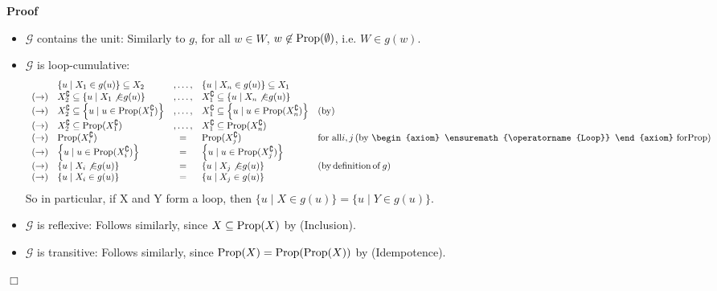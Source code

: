 \documentclass{article}
\newcommand{\nin}{\not\in}
\newcommand{\tmop}[1]{\ensuremath{\operatorname{#1}}}
\newenvironment{proof}{\noindent\textbf{Proof\ }}{\hspace*{\fill}$\Box$\medskip}
\newtheorem{axiom}{Axiom}
\newcommand{\Prop}{\textsf{\tmop{Prop}}}
\begin{document}
\begin{proof}
\begin{itemize}
    \item $\mathcal{G}$ contains the unit: Similarly to $g$, for all $w \in
    W$, $w \nin \Prop (\emptyset)$, i.e. $W \in g (w)$.
    
    \item $\mathcal{G}$ is loop-cumulative:
    \[ \begin{array}{rlcll}
         & \{ u \mid X_1 \in g (u) \} \subseteq X_2 & , \ldots, & \{ u \mid
         X_n \in g (u) \} \subseteq X_1 & \\
         (\rightarrow) & X_2^{\complement} \subseteq \left\{ u \mid X_1
         \not{\in} g (u) \right\} & , \ldots, & X_1^{\complement} \subseteq
         \left\{ u \mid X_n \not{\in} g (u) \right\} & \\
         (\rightarrow) & X_2^{\complement} \subseteq \left\{ u \mid u \in
         \Prop (X_1^{\complement}) \right\} & , \ldots, & X_1^{\complement}
         \subseteq \left\{ u \mid u \in \Prop (X_n^{\complement}) \right\} &
         (\tmop{by})\\
         (\rightarrow) & X^{\complement}_2 \subseteq \Prop (X_1^{\complement})
         & , \ldots, & X^{\complement}_1 \subseteq \Prop (X_n^{\complement}) &
         \\
         (\rightarrow) & \Prop (X_i^{\complement}) & = & \Prop
         (X_j^{\complement}) & \textrm{\tmop{for} \tmop{all}} i, j \left(
         \textrm{\tmop{by} \begin{axiom}
           \tmop{Loop}
         \end{axiom} \tmop{for}}  \Prop \right)\\
         (\rightarrow) & \left\{ u \mid u \in \Prop (X_i^{\complement})
         \right\} & = & \left\{ u \mid u \in \Prop (X_j^{\complement})
         \right\} & \\
         (\rightarrow) & \left\{ u \mid X_i \not{\in} g (u) \right\} & = &
         \left\{ u \mid X_j \not{\in} g (u) \right\} & (\tmop{by}
         \tmop{definition} \tmop{of} g)\\
         (\rightarrow) & \{ u \mid X_i \in g (u) \} & = & \{ u \mid X_j \in g
         (u) \} & 
       \end{array} \]
    So in particular, if X and Y form a loop, then $\{ u \mid X \in g (u) \} =
    \{ u \mid Y \in g (u) \}$.
    
    \item $\mathcal{G}$ is reflexive: Follows similarly, since $X \subseteq
    \Prop (X)$ by (Inclusion).
    
    \item $\mathcal{G}$ is transitive: Follows similarly, since $\Prop (X) =
    \Prop (\Prop (X))$ by (Idempotence).
    

\end{itemize}
\end{proof}
\end{document}
